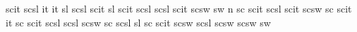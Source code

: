   {scit}  {scsl}
 {it}    {}
%
  {it}    {sl}
  {scsl}  {scit}
 {sl}    {}
%
  {scit}  {scsl}
  {scsl}  {scit}
  {scsw}  {sw}   
 {n}     {}
%
   {sc}    {}
  {scit}  {}
  {scsl}  {scit}
  {scsw}  {sc}    %
  {scit}  {}
 {it}    {}
%
   {sc}     {}
  {scit}  {scsl}
  {scsl}  {}
  {scsw}  {sc}    %
  {scsl}  {}
 {sl}    {}
%
   {sc}     {}
  {scit}  {scsw}
  {scsl}  {}
  {scsw}  {} 
  {scsw}  {}
 {sw}    {}



